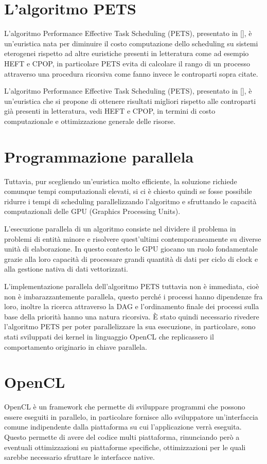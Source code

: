 
\section{L'algoritmo PETS}
L'algoritmo Performance Effective Task Scheduling (PETS), presentato in [], è un'euristica nata per diminuire il costo computazione dello scheduling su sistemi eterogenei rispetto ad altre euristiche presenti in letteratura come ad esempio HEFT e CPOP, in particolare PETS evita di calcolare il rango di un processo attraverso una procedura ricorsiva come fanno invece le controparti sopra citate.

L'algoritmo Performance Effective Task Scheduling (PETS), presentato in [], è un'euristica che si propone di ottenere risultati migliori rispetto alle controparti già presenti in letteratura, vedi HEFT e CPOP, in termini di costo computazionale e ottimizzazione generale delle risorse.

\section{Programmazione parallela}
Tuttavia, pur scegliendo un'euristica molto efficiente, la soluzione richiede comunque tempi computazionali elevati, si ci è chiesto quindi se fosse possibile ridurre i tempi di scheduling parallelizzando l'algoritmo e sfruttando le capacità computazionali delle GPU (Graphics Processing Units).

L'esecuzione parallela di un algoritmo consiste nel dividere il problema in problemi di entità minore e risolvere quest'ultimi contemporaneamente su diverse unità di elaborazione. In questo contesto le GPU giocano un ruolo fondamentale grazie alla loro capacità di processare grandi quantità di dati per ciclo di clock e alla gestione nativa di dati vettorizzati.

L'implementazione parallela dell'algoritmo PETS tuttavia non è immediata, cioè non è imbarazzantemente parallela, questo perché i processi hanno dipendenze fra loro, inoltre la ricerca attraverso la DAG e l'ordinamento finale dei processi sulla base della priorità hanno una natura ricorsiva.
È stato quindi necessario rivedere l'algoritmo PETS per poter parallelizzare la sua esecuzione, in particolare, sono stati sviluppati dei kernel in linguaggio OpenCL che replicassero il comportamento originario in chiave parallela.

\section{OpenCL}
OpenCL è un framework che permette di sviluppare programmi che possono essere eseguiti in parallelo, in particolare fornisce allo sviluppatore un'interfaccia comune indipendente dalla piattaforma su cui l'applicazione verrà eseguita.
Questo permette di avere del codice multi piattaforma, rinunciando però a eventuali ottimizzazioni su piattaforme specifiche, ottimizzazioni per le quali sarebbe necessario sfruttare le interfacce native.




